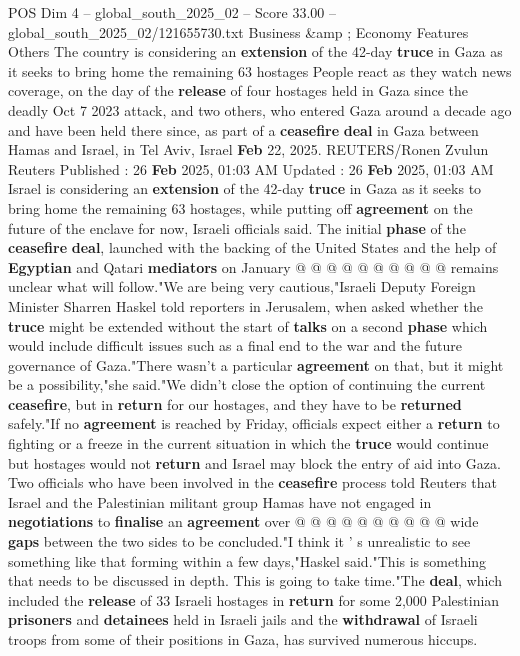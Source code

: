 \begin{textsample}{POS Dim 4 – global\_south\_2025\_02 – Score 33.00 – global\_south\_2025\_02/121655730.txt}  \label{ex:f4_pos_021}
Business \&amp ; Economy Features Others The country is considering an \textbf{extension} of the 42-day \textbf{truce} in Gaza as it seeks to bring home the remaining 63 hostages People react as they watch news coverage, on the day of the \textbf{release} of four hostages held in Gaza since the deadly Oct 7 2023 attack, and two others, who entered Gaza around a decade ago and have been held there since, as part of a \textbf{ceasefire} \textbf{deal} in Gaza between Hamas and Israel, in Tel Aviv, Israel \textbf{Feb} 22, 2025.
REUTERS/Ronen Zvulun Reuters Published : 26 \textbf{Feb} 2025, 01:03 AM Updated : 26 \textbf{Feb} 2025, 01:03 AM Israel is considering an \textbf{extension} of the 42-day \textbf{truce} in Gaza as it seeks to bring home the remaining 63 hostages, while putting off \textbf{agreement} on the future of the enclave for now, Israeli officials said.
The initial \textbf{phase} of the \textbf{ceasefire} \textbf{deal}, launched with the backing of the United States and the help of \textbf{Egyptian} and Qatari \textbf{mediators} on January @ @ @ @ @ @ @ @ @ @ remains unclear what will follow."We are being very cautious,"Israeli Deputy Foreign Minister Sharren Haskel told reporters in Jerusalem, when asked whether the \textbf{truce} might be extended without the start of \textbf{talks} on a second \textbf{phase} which would include difficult issues such as a final end to the war and the future governance of Gaza."There wasn't a particular \textbf{agreement} on that, but it might be a possibility,"she said."We didn't close the option of continuing the current \textbf{ceasefire}, but in \textbf{return} for our hostages, and they have to be \textbf{returned} safely."If no \textbf{agreement} is reached by Friday, officials expect either a \textbf{return} to fighting or a freeze in the current situation in which the \textbf{truce} would continue but hostages would not \textbf{return} and Israel may block the entry of aid into Gaza.
Two officials who have been involved in the \textbf{ceasefire} process told Reuters that Israel and the Palestinian militant group Hamas have not engaged in \textbf{negotiations} to \textbf{finalise} an \textbf{agreement} over @ @ @ @ @ @ @ @ @ @ wide \textbf{gaps} between the two sides to be concluded."I think it ' s unrealistic to see something like that forming within a few days,"Haskel said."This is something that needs to be discussed in depth.
This is going to take time."The \textbf{deal}, which included the \textbf{release} of 33 Israeli hostages in \textbf{return} for some 2,000 Palestinian \textbf{prisoners} and \textbf{detainees} held in Israeli jails and the \textbf{withdrawal} of Israeli troops from some of their positions in Gaza, has survived numerous hiccups.

\end{textsample}
